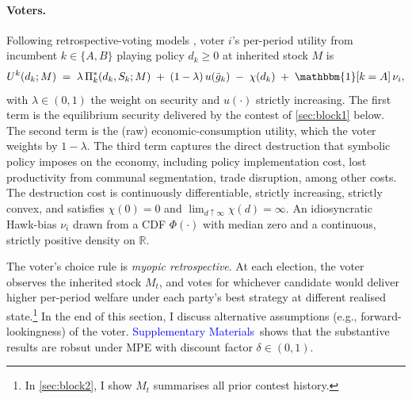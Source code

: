 \documentclass[11pt,twoside]{extarticle}
\newcommand{\suppmat}{\textcolor{blue}{Supplementary Materials}}
\begin{document}
\paragraph{Voters.} 
Following retrospective-voting models \citep*{lindbeckBalancedbudgetRedistributionOutcome1987}, voter $i$'s per-period utility from incumbent $k\in\{A,B\}$ playing policy $d_k\ge 0$ at inherited stock $M$ is
\begin{equation}\label{eq:utility_v3}
    U^k(d_k;M)\;=\;\lambda\,\Pi_k^*(d_k,S_k;M)\;+\;(1-\lambda)\,u(\bar g_k)\;-\;\chi(d_k)\;+\;\mathbbm{1}[k=A]\,\nu_i,
\end{equation}
with $\lambda\in(0,1)$ the weight on security and $u(\cdot)$ strictly increasing. 
The first term is the equilibrium security delivered by the contest of \autoref{sec:block1} below. 
The second term is the (raw) economic-consumption utility, which the voter weights by $1-\lambda$. 
The third term captures the direct destruction that symbolic policy imposes on the economy, including policy implementation cost, lost productivity from communal segmentation, trade disruption, among other costs.
The destruction cost is continuously differentiable, strictly increasing, strictly convex, and satisfies $\chi(0)=0$ and $\lim_{d\uparrow\infty}\chi(d)=\infty$.
An idiosyncratic Hawk-bias $\nu_i$ drawn from a CDF $\Phi(\cdot)$ with median zero and a continuous, strictly positive density on $\mathbb R$. 

The voter's choice rule is \emph{myopic retrospective}. At each election, the voter observes the inherited stock $M_t$, and votes for whichever candidate would deliver higher per-period welfare under each party's best strategy at different realised state.\footnote{In \autoref{sec:block2}, I show $M_t$ summarises all prior contest history.} In the end of this section, I discuss alternative assumptions (e.g., forward-lookingness) of the voter. \suppmat~shows that the substantive results are robsut under MPE with discount factor $\delta\in(0,1)$.

\end{document}
